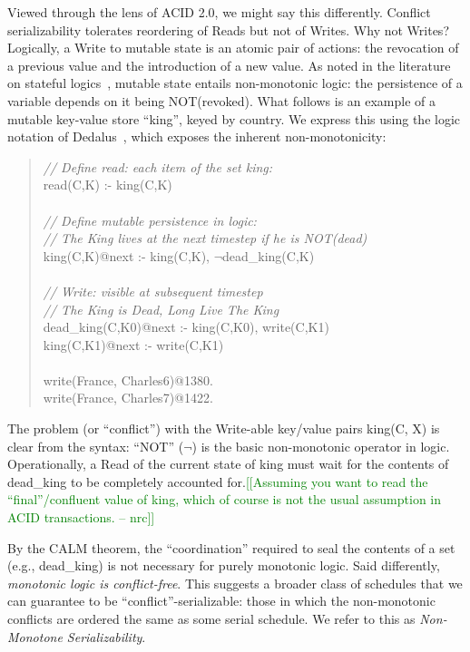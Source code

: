 \documentclass{sig-alternate}
\newcommand{\nrc}[1]{{\textcolor{green}{[[#1 -- nrc]]}}}
\begin{document}
Viewed through the lens of ACID 2.0, we might say this differently.  Conflict
serializability tolerates reordering of Reads but not of Writes.  Why not
Writes?  Logically, a Write to mutable state is an atomic pair of actions: the
revocation of a previous value and the introduction of a new value.  As noted in
the literature on stateful logics~\cite{dedalus,statelog}, mutable state entails
non-monotonic logic: the persistence of a variable depends on it being
NOT(revoked).  What follows is an example of a mutable key-value store ``king'',
keyed by country.  We express this using the logic notation of
Dedalus~\cite{dedalus}, which exposes the inherent non-monotonicity:
\begin{quote}
	\emph{// Define read: each item of the set king: }\\
	read(C,K) :- king(C,K)\\
	\\
	\emph{// Define mutable persistence in logic:}\\
	\emph{// The King lives at the next timestep if he is NOT(dead)}\\
	king(C,K)@next :- king(C,K), $\neg$dead\_king(C,K)\\
	\\
	\emph{// Write: visible at subsequent timestep}\\
	\emph{// The King is Dead, Long Live The King}\\
	dead\_king(C,K0)@next :- king(C,K0), write(C,K1)\\
	king(C,K1)@next :- write(C,K1)\\
	\\
	write(France, Charles6)@1380.\\
	write(France, Charles7)@1422.
\end{quote}
The problem (or ``conflict'') with the Write-able key/value pairs king(C, X) is
clear from the syntax: ``NOT'' ($\neg$) is the basic non-monotonic operator in
logic.  Operationally, a Read of the current state of king must wait for the
contents of dead\_king to be completely accounted for.\nrc{Assuming you want to
  read the ``final''/confluent value of king, which of course is not the usual
  assumption in ACID transactions.}

By the CALM theorem, the ``coordination'' required to seal the contents of a set
(e.g., dead\_king) is not necessary for purely monotonic logic.  Said
differently, \emph{monotonic logic is conflict-free}.  This suggests a broader
class of schedules that we can guarantee to be ``conflict''-serializable: those
in which the non-monotonic conflicts are ordered the same as some serial
schedule.  We refer to this as \emph{Non-Monotone Serializability}.
\end{document}
